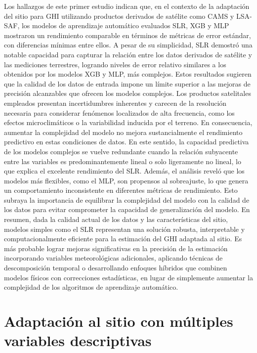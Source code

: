 Los hallazgos de este primer estudio indican que, en el contexto de la adaptación del sitio para GHI utilizando productos derivados de satélite como CAMS y LSA-SAF, los modelos de aprendizaje automático evaluados SLR, XGB y MLP mostraron un rendimiento comparable en términos de métricas de error estándar, con diferencias mínimas entre ellos. A pesar de su simplicidad, SLR demostró una notable capacidad para capturar la relación entre los datos derivados de satélite y las mediciones terrestres, logrando niveles de error relativo similares a los obtenidos por los modelos XGB y MLP, más complejos.
Estos resultados sugieren que la calidad de los datos de entrada impone un límite superior a las mejoras de precisión alcanzables que ofrecen los modelos complejos. Los productos satelitales empleados presentan incertidumbres inherentes y carecen de la resolución necesaria para considerar fenómenos localizados de alta frecuencia, como los efectos microclimáticos o la variabilidad inducida por el terreno. En consecuencia, aumentar la complejidad del modelo no mejora sustancialmente el rendimiento predictivo en estas condiciones de datos. En este sentido, la capacidad predictiva de los modelos complejos se vuelve redundante cuando la relación subyacente entre las variables es predominantemente lineal o solo ligeramente no lineal, lo que explica el excelente rendimiento del SLR.
Además, el análisis reveló que los modelos más flexibles, como el MLP, son propensos al sobreajuste, lo que genera un comportamiento inconsistente en diferentes métricas de rendimiento. Esto subraya la importancia de equilibrar la complejidad del modelo con la calidad de los datos para evitar comprometer la capacidad de generalización del modelo. En resumen, dada la calidad actual de los datos y las características del sitio, modelos simples como el SLR representan una solución robusta, interpretable y computacionalmente eficiente para la estimación del GHI adaptada al sitio. Es más probable lograr mejoras significativas en la precisión de la estimación incorporando variables meteorológicas adicionales, aplicando técnicas de descomposición temporal o desarrollando enfoques híbridos que combinen modelos físicos con correcciones estadísticas, en lugar de simplemente aumentar la complejidad de los algoritmos de aprendizaje automático.

 


\section{Adaptación al sitio con múltiples variables descriptivas}

